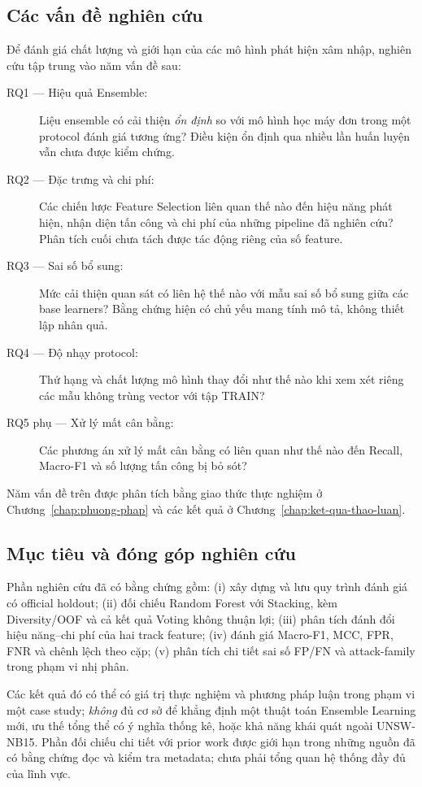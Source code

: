 \subsection{Các vấn đề nghiên cứu}
Để đánh giá chất lượng và giới hạn của các mô hình phát hiện xâm nhập, nghiên cứu tập trung vào năm vấn đề sau:

\begin{description}
\item[RQ1 --- Hiệu quả Ensemble:] Liệu ensemble có cải thiện \emph{ổn định} so với mô hình học máy đơn trong một protocol đánh giá tương ứng? Điều kiện ổn định qua nhiều lần huấn luyện vẫn chưa được kiểm chứng.
\item[RQ2 --- Đặc trưng và chi phí:] Các chiến lược Feature Selection liên quan thế nào đến hiệu năng phát hiện, nhận diện tấn công và chi phí của những pipeline đã nghiên cứu? Phân tích cuối chưa tách được tác động riêng của số feature.
\item[RQ3 --- Sai số bổ sung:] Mức cải thiện quan sát có liên hệ thế nào với mẫu sai số bổ sung giữa các base learners? Bằng chứng hiện có chủ yếu mang tính mô tả, không thiết lập nhân quả.
\item[RQ4 --- Độ nhạy protocol:] Thứ hạng và chất lượng mô hình thay đổi như thế nào khi xem xét riêng các mẫu không trùng vector với tập TRAIN?
\item[RQ5 phụ --- Xử lý mất cân bằng:] Các phương án xử lý mất cân bằng có liên quan như thế nào đến Recall, Macro-F1 và số lượng tấn công bị bỏ sót?
\end{description}

Năm vấn đề trên được phân tích bằng giao thức thực nghiệm ở Chương~\ref{chap:phuong-phap} và các kết quả ở Chương~\ref{chap:ket-qua-thao-luan}.

\subsection{Mục tiêu và đóng góp nghiên cứu}
Phần nghiên cứu đã có bằng chứng gồm: (i) xây dựng và lưu quy trình đánh giá có official holdout; (ii) đối chiếu Random Forest với Stacking, kèm Diversity/OOF và cả kết quả Voting không thuận lợi; (iii) phân tích đánh đổi hiệu năng--chi phí của hai track feature; (iv) đánh giá Macro-F1, MCC, FPR, FNR và chênh lệch theo cặp; (v) phân tích chi tiết sai số FP/FN và attack-family trong phạm vi nhị phân.

Các kết quả đó có thể có giá trị thực nghiệm và phương pháp luận trong phạm vi một case study; \emph{không} đủ cơ sở để khẳng định một thuật toán Ensemble Learning mới, ưu thế tổng thể có ý nghĩa thống kê, hoặc khả năng khái quát ngoài UNSW-NB15. Phần đối chiếu chi tiết với prior work được giới hạn trong những nguồn đã có bằng chứng đọc và kiểm tra metadata; chưa phải tổng quan hệ thống đầy đủ của lĩnh vực.

